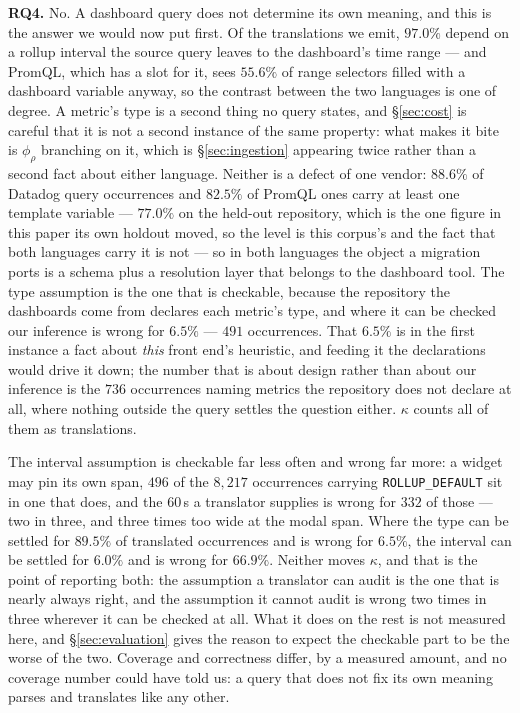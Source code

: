 \textbf{RQ4.} No. A dashboard query does not determine its own meaning, and this is the
answer we would now put first. Of the translations we emit, $97.0\%$ depend on a rollup
interval the source query leaves to the dashboard's time range --- and PromQL, which has
a slot for it, sees $55.6\%$ of range selectors filled with a dashboard variable anyway,
so the contrast between the two languages is one of degree. A metric's type is a second
thing no query states, and \S\ref{sec:cost} is careful that it is not a
second instance of the same property: what makes it bite is $\phi_\rho$ branching on
it, which is \S\ref{sec:ingestion} appearing twice rather than a second fact about
either language. Neither is a defect of one vendor: $88.6\%$ of
Datadog query occurrences and $82.5\%$ of PromQL ones carry at least one template
variable --- $77.0\%$ on the held-out repository, which is the one figure in this
paper its own holdout moved, so the level is this corpus's and the fact that both
languages carry it is not --- so in both languages the object a migration ports is a schema plus a
resolution layer that belongs to the dashboard tool. The type assumption is the one that
is checkable, because the repository the dashboards come from declares each metric's
type, and where it can be checked our inference is wrong for $6.5\%$ --- $491$
occurrences. That $6.5\%$ is in the first
instance a fact about \emph{this} front end's heuristic, and feeding it the declarations
would drive it down; the number that is about design rather than about our inference is
the $736$ occurrences naming metrics the repository does not declare at all, where
nothing outside the query settles the question either. $\kappa$ counts all of them as
translations.

The interval assumption is checkable far less often and wrong far more: a widget may pin
its own span, $496$ of the $8{,}217$ occurrences carrying \texttt{ROLLUP\_DEFAULT} sit in
one that does, and the $60$\,s a translator supplies is wrong for $332$ of those --- two
in three, and three times too wide at the modal span. Where the type can be settled for
$89.5\%$ of translated occurrences and is wrong for $6.5\%$, the interval can be settled
for $6.0\%$ and is wrong for $66.9\%$. Neither moves $\kappa$, and that is the point of
reporting both: the assumption a translator can audit is the one that is nearly always
right, and the assumption it cannot audit is wrong two times in three wherever it can be
checked at all. What it does on the rest is not measured here, and \S\ref{sec:evaluation}
gives the reason to expect the checkable part to be the worse of the two.
Coverage and correctness differ, by a measured amount, and no coverage number could have
told us: a query that does not fix its own meaning parses and translates like any
other.

